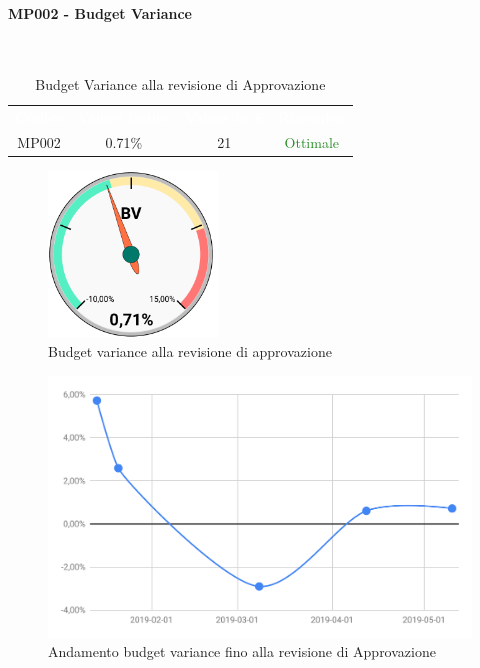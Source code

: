 \paragraph{MP002 - Budget Variance}\mbox{}\\[0,3cm]
    \begin{table}[H]
        \centering
        \begin{tabular}{cccc}
            \rowcolor{greySWEight}
            \textcolor{white}{\textbf{Codice}} &
            \textcolor{white}{\textbf{Valore Indice}}&
            \textcolor{white}{\textbf{Valore in €}}&
            \textcolor{white}{\textbf{Riscontro}}\\
            MP002 & 0.71\% & 21 & \textcolor{ForestGreen}{Ottimale}\\
        \end{tabular}
        \caption{Budget Variance alla revisione di Approvazione}
    \end{table}
    \begin{figure}[H]
        \centering
        \includegraphics[width=45mm]{sez/App_Esito/Approvazione/graph/budgetVarianceRA.pdf}
        \caption{Budget variance alla revisione di approvazione}
    \end{figure}
    \begin{figure}[H]
        \centering
        \includegraphics[width=0.7\linewidth]{sez/App_Esito/Approvazione/graph/budgetVarianceRAStorico.pdf}
        \caption{Andamento budget variance fino alla revisione di Approvazione}
    \end{figure}
    \newpage